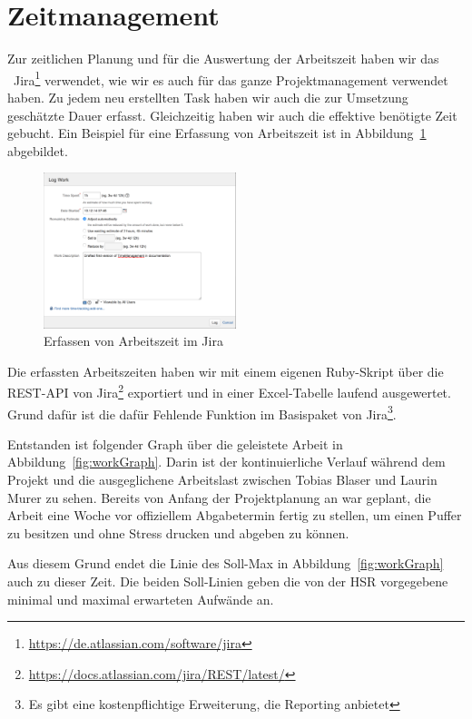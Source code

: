 \chapter*{Zeitmanagement}
	Zur zeitlichen Planung und für die Auswertung der Arbeitszeit haben wir das \ppt\ Jira\footnote{\url{https://de.atlassian.com/software/jira}} verwendet,
	wie wir es auch für das ganze Projektmanagement verwendet haben.
	Zu jedem neu erstellten Task haben wir auch die zur Umsetzung geschätzte Dauer erfasst.
	Gleichzeitig haben wir auch die effektive benötigte Zeit gebucht.
	Ein Beispiel für eine Erfassung von Arbeitszeit ist in Abbildung\ \ref{fig:logWork} abgebildet.
	
	\begin{figure}[H]
		\includegraphics[width=0.5\textwidth]{projectPlan/media/img/logWork.png}
		\centering
		\caption{Erfassen von Arbeitszeit im Jira}
		\label{fig:logWork}
	\end{figure}
	
	Die erfassten Arbeitszeiten haben wir mit einem eigenen Ruby-Skript über die REST-API von Jira\footnote{\url{https://docs.atlassian.com/jira/REST/latest/}} exportiert
	und in einer Excel-Tabelle laufend ausgewertet.
	Grund dafür ist die dafür Fehlende Funktion im Basispaket von Jira\footnote{Es gibt eine kostenpflichtige Erweiterung, die Reporting anbietet}.
	
	Entstanden ist folgender Graph über die geleistete Arbeit in Abbildung\ \ref{fig:workGraph}.
	Darin ist der kontinuierliche Verlauf während dem Projekt
	und die ausgeglichene Arbeitslast zwischen Tobias Blaser und Laurin Murer zu sehen.
	Bereits von Anfang der Projektplanung an war geplant, die Arbeit eine Woche vor offiziellem Abgabetermin fertig zu stellen, um einen Puffer zu besitzen und ohne Stress drucken und abgeben zu können.
	
	Aus diesem Grund endet die Linie des Soll-Max in Abbildung\ \ref{fig:workGraph} auch zu dieser Zeit.
	Die beiden Soll-Linien geben die von der HSR vorgegebene minimal und maximal erwarteten Aufwände an.
	

